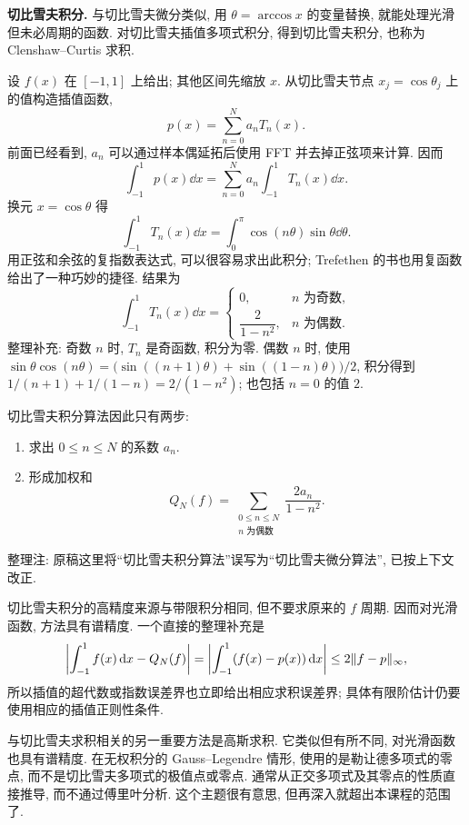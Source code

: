 \textbf{切比雪夫积分.} 与切比雪夫微分类似, 用 $\theta=\arccos x$ 的变量替换, 就能处理光滑但未必周期的函数. 对切比雪夫插值多项式积分, 得到切比雪夫积分, 也称为 Clenshaw--Curtis 求积.

设 $f(x)$ 在 $[-1,1]$ 上给出; 其他区间先缩放 $x$. 从切比雪夫节点 $x_j=\cos\theta_j$ 上的值构造插值函数,
\[
p(x)=\sum_{n=0}^{N}a_nT_n(x).
\]
前面已经看到, $a_n$ 可以通过样本偶延拓后使用 FFT 并去掉正弦项来计算. 因而
\[
\int_{-1}^{1}p(x)\dd x
=\sum_{n=0}^{N}a_n\int_{-1}^{1}T_n(x)\dd x.
\]
换元 $x=\cos\theta$ 得
\[
\int_{-1}^{1}T_n(x)\dd x=\int_0^\pi\cos(n\theta)\sin\theta\dd\theta.
\]
用正弦和余弦的复指数表达式, 可以很容易求出此积分; Trefethen 的书也用复函数给出了一种巧妙的捷径. 结果为
\[
\int_{-1}^{1}T_n(x)\dd x=
\begin{cases}
0,&n\text{ 为奇数},\\
\dfrac2{1-n^2},&n\text{ 为偶数}.
\end{cases}
\]
整理补充: 奇数 $n$ 时, $T_n$ 是奇函数, 积分为零. 偶数 $n$ 时, 使用
$\sin\theta\cos(n\theta)=\bigl(\sin((n+1)\theta)+\sin((1-n)\theta)\bigr)/2$,
积分得到 $1/(n+1)+1/(1-n)=2/(1-n^2)$; 也包括 $n=0$ 的值 $2$.

切比雪夫积分算法因此只有两步:
\begin{enumerate}
\item 求出 $0\le n\le N$ 的系数 $a_n$.
\item 形成加权和
\[
Q_N(f)=\sum_{\substack{0\le n\le N\\n\text{ 为偶数}}}
\frac{2a_n}{1-n^2}.
\]
\end{enumerate}
整理注: 原稿这里将“切比雪夫积分算法”误写为“切比雪夫微分算法”, 已按上下文改正.

切比雪夫积分的高精度来源与带限积分相同, 但不要求原来的 $f$ 周期. 因而对光滑函数, 方法具有谱精度. 一个直接的整理补充是
\[
\left|\int_{-1}^{1}f(x)\,\mathrm d x-Q_N(f)\right|
=\left|\int_{-1}^{1}(f(x)-p(x))\,\mathrm d x\right|
\le2\lVert f-p\rVert_\infty,
\]
所以插值的超代数或指数误差界也立即给出相应求积误差界; 具体有限阶估计仍要使用相应的插值正则性条件.

与切比雪夫求积相关的另一重要方法是高斯求积. 它类似但有所不同, 对光滑函数也具有谱精度. 在无权积分的 Gauss--Legendre 情形, 使用的是勒让德多项式的零点, 而不是切比雪夫多项式的极值点或零点. 通常从正交多项式及其零点的性质直接推导, 而不通过傅里叶分析. 这个主题很有意思, 但再深入就超出本课程的范围了.
